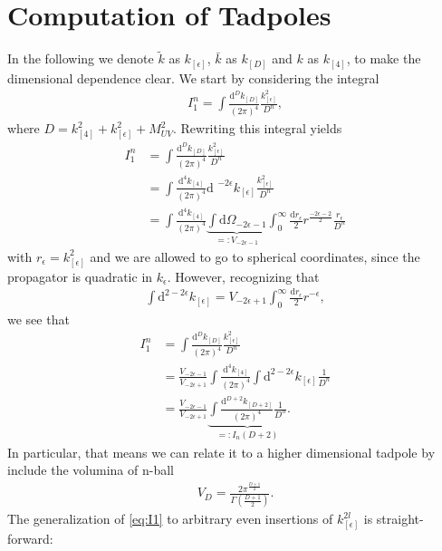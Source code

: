 \section{Computation of Tadpoles}
In the following we denote $\tilde{k}$ as $k_{[\epsilon]}$, $\bar{k}$ as $k_{[D]}$ and $k$ as $k_{[4]}$, to make the dimensional dependence clear. We start by considering the integral 
\begin{align}
	I_1^{n}=\int \frac{\text{d}^D k_{[D]}}{(2 \pi)^4} \frac{k_{[\epsilon]}^2}{D^n} ,
\end{align}
where $D=k_{[4]}^2+k_{[\epsilon]}^2+M_{UV}^2$.
Rewriting this integral yields
\begin{align}
	I_1^{n} &=\int \frac{\text{d}^D k_{[D]}}{(2 \pi)^4} \frac{k_{[\epsilon]}^2}{D^n} \\
		&=\int \frac{\text{d}^4 k_{[4]}}{(2 \pi)^4} \text{d }^{-2\epsilon} k_{[\epsilon]} \frac{k_{[\epsilon]}^2}{D^n} \\
		&=\int \frac{\text{d}^4 k_{[4]}}{(2 \pi)^4} \underbrace{\int \text{d}\Omega_{-2\epsilon-1}}_{=:V_{-2\epsilon-1}} \int_{0}^{\infty}  \frac{\text{d} r_{\epsilon}}{2} r^{\frac{-2\epsilon-2}{2}}\frac{r_{\epsilon}}{D^n}
\end{align}
with $r_{\epsilon}=k_{[\epsilon]}^2$ and we are allowed to go to spherical coordinates, since the propagator is quadratic in $k_{\epsilon}$. However, recognizing that
\begin{align}
\int \text{d}^{2-2 \epsilon} k_{[\epsilon]}	= V_{-2\epsilon+1}\int_{0}^{\infty}\frac{\text{d} r_{\epsilon}}{2} r^{-\epsilon} , 
\end{align}
we see that
\begin{align}
	I_1^{n} &=\int \frac{\text{d}^D k_{[D]}}{(2 \pi)^4} \frac{k_{[\epsilon]}^2}{D^n} \\
		&= \frac{V_{-2\epsilon-1}}{V_{-2\epsilon+1}}\int \frac{\text{d}^4 k_{[4]}}{(2 \pi)^4} \int \text{d}^{2-2 \epsilon} k_{[\epsilon]} \frac{1}{D^n} \\
		&=\frac{V_{-2\epsilon-1}}{V_{-2\epsilon+1}}\underbrace{\int \frac{\text{d}^{D+2} k_{[D+2]}}{(2 \pi)^4} \frac{1}{D^n}}_{=:I_n(D+2)}. \label{eq:I1}
\end{align}
In particular, that means we can relate it to a higher dimensional tadpole by include the volumina of n-ball
\begin{align}
	V_D=\frac{2\pi^{\frac{D+1}{2}}}{\Gamma\left(\frac{D+1}{2}\right)}.
\end{align}
The generalization of \eqref{eq:I1} to arbitrary even insertions of $k_{[\epsilon]}^{2l}$ is straight-forward:
